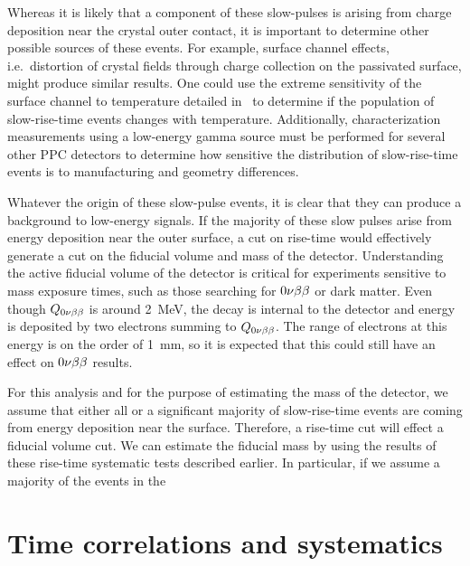 Whereas it is likely that a component of these slow-pulses is arising from charge deposition near the crystal outer contact, it is important to determine other possible sources of these events.  For example, surface channel effects, i.e.~distortion of crystal fields through charge collection on the passivated surface, might produce similar results.  One could use the extreme sensitivity of the surface channel to temperature detailed in~\cite{Hull1995488} to determine if the population of slow-rise-time events changes with temperature.  Additionally, characterization measurements using a low-energy gamma source must be performed for several other PPC detectors to determine how sensitive the distribution of slow-rise-time events is to manufacturing and geometry differences.  

Whatever the origin of these slow-pulse events, it is clear that they can produce a background to low-energy signals.  If the majority of these slow pulses arise from energy deposition near the outer surface, a cut on rise-time would effectively generate a cut on the fiducial volume and mass of the detector.  Understanding the active fiducial volume of the detector is critical for experiments sensitive to mass exposure times, such as those searching for $0 \nu \beta \beta$ or dark matter.  Even though $Q_{0 \nu \beta \beta}$ is around 2~MeV, the decay is internal to the detector and energy is deposited by two electrons summing to $Q_{0 \nu \beta \beta}$.  The range of electrons at this energy is on the order of 1~mm, so it is expected that this could still have an effect on $0 \nu \beta \beta$ results.  

For this analysis and for the purpose of estimating the mass of the detector, we assume that either all or a significant majority of slow-rise-time events are coming from energy deposition near the surface.  Therefore, a rise-time cut will effect a fiducial volume cut.  We can estimate the fiducial mass by using the results of these rise-time systematic tests described earlier.  In particular, if we assume a majority of the events in the 

	\section{Time correlations and systematics}
	\label{sec:BeGeTimeCorrelations}

